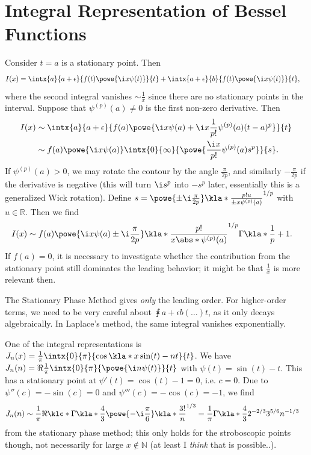 \documentclass[english, parskip=full]{scrartcl}
\newcommand{\definition}[2]{\begin{tcolorbox}[colback=colorbackgrounddefinition,colframe=colordefinition, breakable,enhanced,title=\textbf{#1}.]#2\end{tcolorbox}}
\newcommand{\note}[1]{\begin{tcolorbox}[colback=colorbackgroundnote,colframe=colornote, breakable,enhanced]#1\end{tcolorbox}}
\begin{document}
\section{Integral Representation of Bessel Functions}
\definition{Stationary Phase Method}{Consider $t=a$ is a stationary point.
Then
\begin{align}
I(x) &= \intx{a}{a+\epsilon}{f(t)\powe{\i x\psi(t)}}{t} + \intx{a+\epsilon}{b}{f(t)\powe{\i x\psi(t)}}{t},
\end{align}
where the second integral vanishes $\sim \frac{1}{x}$ since there are no stationary points in the interval.
Suppose that $\psi^{(p)}(a)\neq 0$ is the first non-zero derivative.
Then
\begin{align}
I(x) &\sim \intx{a}{a+\epsilon}{f(a) \powe{\i x\psi(a) + \i x\frac{1}{p!} \psi^{(p)}(a) (t-a)^p}}{t}\\
&\sim f(a) \powe{\i x\psi(a)} \intx{0}{\infty}{\powe{\frac{\i x}{p!} \psi^{(p)}(a) s^p}}{s}.
\end{align}
If $\psi^{(p)}(a)>0$, we may rotate the contour by the angle $\frac{\pi}{2p}$, and similarly $-\frac{\pi}{2p}$ if the derivative is negative (this will turn $\i s^p$ into $-s^p$ later, essentially this is a generalized Wick rotation).
Define $s=\powe{\pm \i \frac{\pi}{2p}} \kla*{\frac{p! u}{\pm x\psi^{(p)}(a)}}^{1/p}$ with $u\in\mathbb{R}$.
Then we find
\begin{align}
I(x) &\sim f(a) \powe{\i x\psi(a) \pm \i \frac{\pi}{2p}} \kla*{\frac{p!}{x\abs*{\psi^{(p)}(a)}}}^{1/p} \Gamma\kla*{\frac{1}{p}+1}.
\end{align}
If $f(a)=0$, it is necessary to investigate whether the contribution from the stationary point still dominates the leading behavior; it might be that $\frac{1}{x}$ is more relevant then.
\note{The Stationary Phase Method gives \emph{only} the leading order.
For higher-order terms, we need to be very careful about $\intx{a+\epsilon}{b}{(\dots)}{t}$, as it only decays algebraically.
In Laplace's method, the same integral vanishes exponentially. }
}
One of the integral representations is $J_n(x) = \frac{1}{\pi} \intx{0}{\pi}{\cos\kla*{x\sin (t) - nt}}{t}$.
We have $J_n(n) = \Re \frac{1}{\pi} \intx{0}{\pi}{\powe{\i n\psi(t)}}{t}$ with $\psi(t) = \sin(t)-t$.
This has a stationary point at $\psi'(t)=\cos(t)-1=0$, i.e. $c=0$.
Due to $\psi''(c)=-\sin(c)=0$ and $\psi'''(c)=-\cos(c)=-1$, we find
\begin{align}
J_n(n) &\sim \frac{1}{\pi} \Re\klc*{\Gamma\kla*{\frac{4}{3}} \powe{-\i \frac{\pi}{6}} \kla*{\frac{3!}{n}}^{1/3}} = \frac{1}{\pi} \Gamma\kla*{\frac{4}{3}} 2^{-2/3} 3^{5/6} n^{-1/3}
\end{align}
from the stationary phase method; this only holds for the stroboscopic points though, not necessarily for large $x\notin \mathbb{N}$ (at least I \emph{think} that is possible..).
\end{document}
